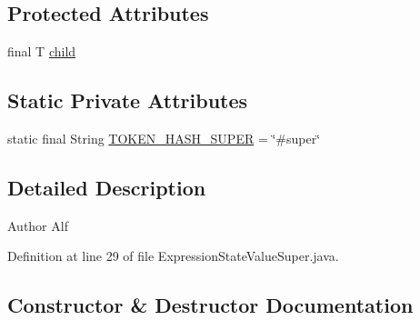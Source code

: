 \subsection*{Protected Attributes}
\begin{DoxyCompactItemize}
\item 
final T \hyperlink{classgov_1_1nasa_1_1jpf_1_1inspector_1_1server_1_1expression_1_1_expression_state_unary_operator_a66041b1f569a361549e28a00f7ca5f2f}{child}
\end{DoxyCompactItemize}
\subsection*{Static Private Attributes}
\begin{DoxyCompactItemize}
\item 
static final String \hyperlink{classgov_1_1nasa_1_1jpf_1_1inspector_1_1server_1_1expression_1_1expressions_1_1_expression_state_value_super_ab4ef1d41a5534563505035d19e6ed946}{T\+O\+K\+E\+N\+\_\+\+H\+A\+S\+H\+\_\+\+S\+U\+P\+ER} = \char`\"{}\#super\char`\"{}
\end{DoxyCompactItemize}


\subsection{Detailed Description}
\begin{DoxyAuthor}{Author}
Alf 
\end{DoxyAuthor}


Definition at line 29 of file Expression\+State\+Value\+Super.\+java.



\subsection{Constructor \& Destructor Documentation}
